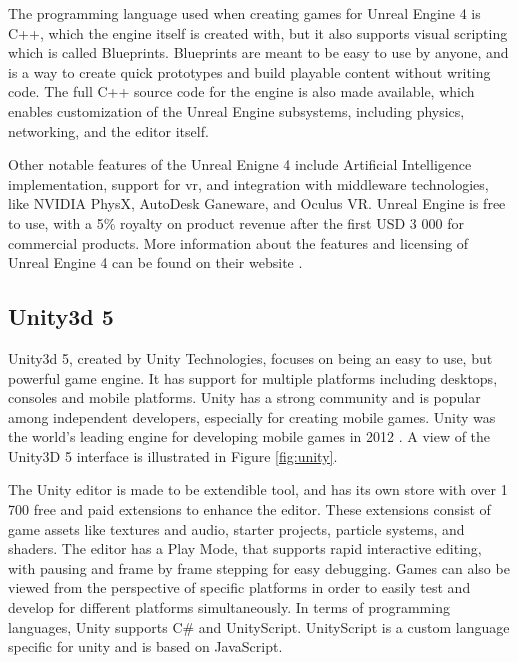 
The programming language used when creating games for Unreal Engine 4 is C++, which the engine itself is created with, but it also supports visual scripting which is called Blueprints. Blueprints are meant to be easy to use by anyone, and is a way to create quick prototypes and build playable content without writing code. The full C++ source code for the engine is also made available, which enables customization of the Unreal Engine subsystems, including physics, networking, and the editor itself.

Other notable features of the Unreal Enigne 4 include Artificial Intelligence implementation, support for \gls{vr}, and integration with middleware technologies, like NVIDIA PhysX, AutoDesk Ganeware, and Oculus VR. Unreal Engine is free to use, with a 5\% royalty on product revenue after the first USD 3 000 for commercial products. More information about the features and licensing of Unreal Engine 4 can be found on their website \cite{unreal2016engine}.


\subsection{Unity3d 5}
Unity3d 5, created by Unity Technologies, focuses on being an easy to use, but powerful game engine. It has support for multiple platforms including desktops, consoles and mobile platforms. Unity has a strong community and is popular among independent developers, especially for creating mobile games. Unity was the world's leading engine for developing mobile games in 2012 \cite{bratcher2013unity}. A view of the Unity3D 5 interface is illustrated in Figure \ref{fig:unity}.


The Unity editor is made to be extendible tool, and has its own store with over 1 700 free and paid extensions to enhance the editor. These extensions consist of game assets like textures and audio, starter projects, particle systems, and shaders. The editor has a Play Mode, that supports rapid interactive editing, with pausing and frame by frame stepping for easy debugging. Games can also be viewed from the perspective of specific platforms in order to easily test and develop for different platforms simultaneously. In terms of programming languages, Unity supports C\# and UnityScript. UnityScript is a custom language specific for unity and is based on JavaScript. \cite{unity2016editor, unity2016script}

